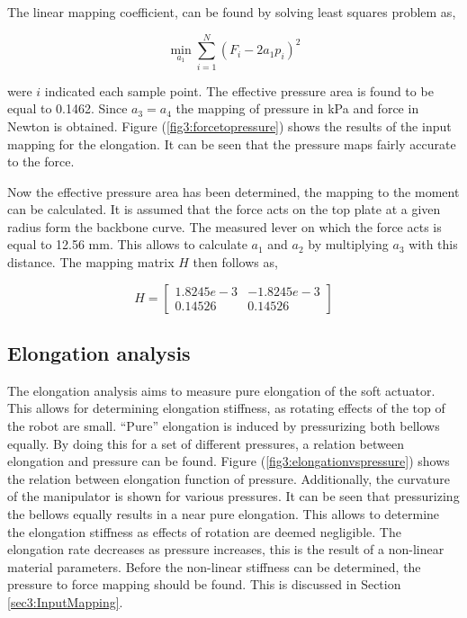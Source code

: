 The linear mapping coefficient, can be found by solving least squares problem as,



\begin{equation}
\min_{a_1} \sum_{i=1}^{N} (F_i - 2 a_1 p_i)^2
\label{eq3:forcefitting}
\end{equation}

were $i$ indicated each sample point. The effective pressure area is found to be equal to 0.1462. Since $a_3 = a_4$ the mapping of pressure in kPa and force in Newton is obtained. Figure (\ref{fig3:forcetopressure}) shows the results of the input mapping for the elongation. It can be seen that the pressure maps fairly accurate to the force.

Now the effective pressure area has been determined, the mapping to the moment can be calculated. It is assumed that the force acts on the top plate at a given radius form the backbone curve. The measured lever on which the force acts is equal to 12.56 mm. This allows to calculate $a_1$ and $a_2$ by multiplying $a_3$ with this distance. The mapping matrix $H$ then follows as,

\begin{equation}
    H =  \begin{bmatrix} 1.8245e-3 & -1.8245e-3 \\
    0.14526 & 0.14526\end{bmatrix}  
\end{equation}










\subsection{Elongation analysis}


The elongation analysis aims to measure pure elongation of the soft actuator. This allows for determining elongation stiffness, as rotating effects of the top of the robot are small. ``Pure'' elongation is induced by pressurizing both bellows equally. By doing this for a set of different pressures, a relation between elongation and pressure can be found. Figure (\ref{fig3:elongationvspressure}) shows the relation between elongation function of pressure. Additionally, the curvature of the manipulator is shown for various pressures. It can be seen that pressurizing the bellows equally results in a near pure elongation. This allows to determine the elongation stiffness as effects of rotation are deemed negligible. The elongation rate decreases as pressure increases, this is the result of a non-linear material parameters. Before the non-linear stiffness can be determined, the pressure to force mapping should be found. This is discussed in Section \ref{sec3:InputMapping}.

